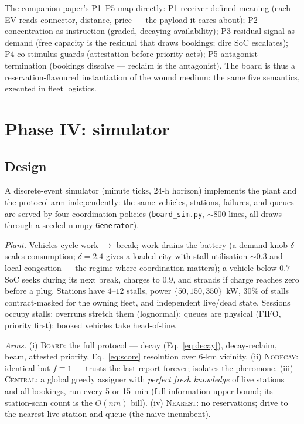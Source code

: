 \documentclass[twoside,twocolumn,usenatbib]{mnras}
\begin{document}
The companion paper's P1--P5 map directly: P1 receiver-defined
meaning (each EV reads connector, distance, price --- the payload it
cares about); P2 concentration-as-instruction (graded, decaying
availability); P3 residual-signal-as-demand (free capacity is the
residual that draws bookings; dire SoC escalates); P4 co-stimulus
guards (attestation before priority acts); P5 antagonist
termination (bookings dissolve --- reclaim is the antagonist).  The
board is thus a reservation-flavoured instantiation of the wound
medium: the same five semantics, executed in fleet logistics.

\section{Phase IV: simulator}

\label{sec:sim}

\subsection{Design}

A discrete-event simulator (minute ticks, $24$-h horizon) implements the
plant and the protocol arm-independently: the same vehicles, stations,
failures, and queues are served by four coordination policies
(\texttt{board\_sim.py}, $\sim$800 lines, all draws through a seeded
numpy \texttt{Generator}).

\emph{Plant.}  Vehicles cycle work $\to$ break; work drains the battery
(a demand knob $\delta$ scales consumption; $\delta=2.4$ gives a loaded
city with stall utilisation $\sim\!0.3$ and local congestion --- the
regime where coordination matters); a vehicle below $0.7$ SoC seeks
during its next break, charges to $0.9$, and strands if charge reaches
zero before a plug.  Stations have $4$--$12$ stalls, power
$\{50,150,350\}$~kW, $30\%$ of stalls contract-masked for the owning
fleet, and independent live/dead state.  Sessions occupy stalls;
overruns stretch them (lognormal); queues are physical (FIFO, priority
first); booked vehicles take head-of-line.

\emph{Arms.}  (i) \textsc{Board}: the full protocol --- decay
(Eq.~\ref{eq:decay}), decay-reclaim, beam, attested priority, Eq.~\ref{eq:score}
resolution over $6$-km vicinity.  (ii) \textsc{Nodecay}: identical but
$f\equiv1$ --- trusts the last report forever; isolates the pheromone.
(iii) \textsc{Central}: a global greedy assigner with \emph{perfect
fresh knowledge} of live stations and all bookings, run every 5 or
15~min (full-information upper bound; its station-scan count is the
$O(nm)$ bill).  (iv) \textsc{Nearest}: no reservations; drive to the
nearest live station and queue (the naive incumbent).
\end{document}
